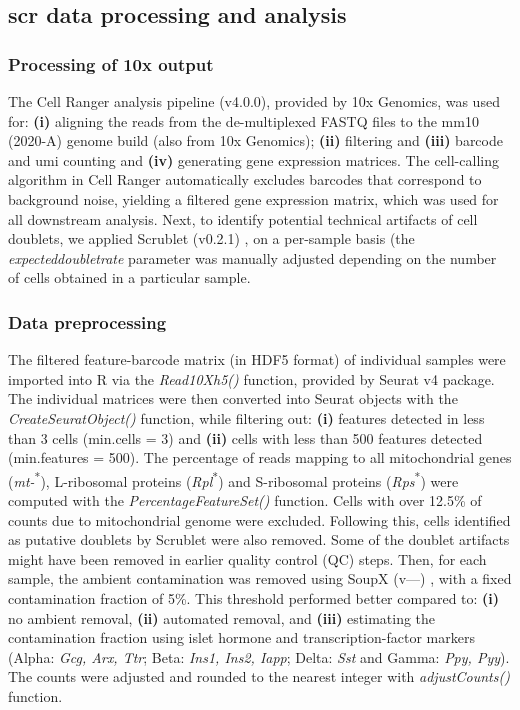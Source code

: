 \subsection[\glslink{scr}{scRNA-seq} data processing and analysis]{\gls{scr} data processing and analysis}


\subsubsection{\large Processing of 10x output}
The Cell Ranger analysis pipeline (v4.0.0), provided by 10x Genomics, was used for: \textbf{(i)} aligning the reads from the de-multiplexed FASTQ files to the mm10 (2020-A) genome build (also from 10x Genomics); \textbf{(ii)} filtering and \textbf{(iii)} barcode and \gls{umi} counting and \textbf{(iv)} generating gene expression matrices. The cell-calling algorithm in Cell Ranger automatically excludes barcodes that correspond to background noise, yielding a filtered gene expression matrix, which was used for all downstream analysis. Next, to identify potential technical artifacts of cell doublets, we applied Scrublet (v0.2.1) \textbf{\cite{wolock_scrublet_2019}}, on a per-sample basis (the \textit{expected\textunderscore doublet\textunderscore rate} parameter was manually adjusted depending on the number of cells obtained in a particular sample. 

\subsubsection{\large Data preprocessing}
The filtered feature-barcode matrix (in HDF5 format) of individual samples were imported into R via the \textit{Read10X\textunderscore h5()} function, provided by Seurat v4 \textbf{\cite{hao_integrated_2021}} package. The individual matrices were then converted into Seurat objects with the \textit{CreateSeuratObject()} function, while filtering out: \textbf{(i)} features detected in less than 3 cells (min.cells = 3) and \textbf{(ii)} cells with less than 500 features detected (min.features = 500). The percentage of reads mapping to all mitochondrial genes (\textit{mt-}\textsuperscript{*}), L-ribosomal proteins (\textit{Rpl}\textsuperscript{*}) and S-ribosomal proteins (\textit{Rps}\textsuperscript{*}) were computed with the \textit{PercentageFeatureSet()} function. Cells with over 12.5\% of counts due to mitochondrial genome were excluded. Following this, cells identified as putative doublets by Scrublet were also removed. Some of the doublet artifacts might have been removed in earlier quality control (QC) steps. Then, for each sample, the ambient  contamination was removed using SoupX (v---) \textbf{\cite{young_soupx_2020}}, with a fixed contamination fraction of 5\%. This threshold performed better compared to: \textbf{(i)} no ambient  removal, \textbf{(ii)} automated removal, and \textbf{(iii)} estimating the contamination fraction using islet hormone and transcription-factor markers (Alpha: \textit{Gcg, Arx, Ttr}; Beta: \textit{Ins1, Ins2, Iapp}; Delta: \textit{Sst} and Gamma: \textit{Ppy, Pyy}). The counts were adjusted and rounded to the nearest integer with \textit{adjustCounts()} function.  

